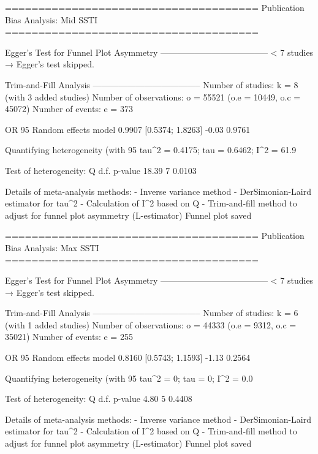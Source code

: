 ======================================
Publication Bias Analysis: Mid SSTI 
======================================
                                                                                                                                                        
Egger's Test for Funnel Plot Asymmetry
--------------------------------------
  < 7 studies → Egger’s test skipped.

Trim-and-Fill Analysis
--------------------------------------
Number of studies: k = 8 (with 3 added studies)
Number of observations: o = 55521 (o.e = 10449, o.c = 45072)
Number of events: e = 373

                         OR           95%
Random effects model 0.9907 [0.5374; 1.8263] -0.03  0.9761

Quantifying heterogeneity (with 95%
 tau^2 = 0.4175; tau = 0.6462; I^2 = 61.9%

Test of heterogeneity:
     Q d.f. p-value
 18.39    7  0.0103

Details of meta-analysis methods:
- Inverse variance method
- DerSimonian-Laird estimator for tau^2
- Calculation of I^2 based on Q
- Trim-and-fill method to adjust for funnel plot asymmetry (L-estimator)
  Funnel plot saved

======================================
Publication Bias Analysis: Max SSTI 
======================================
                                                                                                                                                        
Egger's Test for Funnel Plot Asymmetry
--------------------------------------
  < 7 studies → Egger’s test skipped.

Trim-and-Fill Analysis
--------------------------------------
Number of studies: k = 6 (with 1 added studies)
Number of observations: o = 44333 (o.e = 9312, o.c = 35021)
Number of events: e = 255

                         OR           95%
Random effects model 0.8160 [0.5743; 1.1593] -1.13  0.2564

Quantifying heterogeneity (with 95%
 tau^2 = 0; tau = 0; I^2 = 0.0%

Test of heterogeneity:
    Q d.f. p-value
 4.80    5  0.4408

Details of meta-analysis methods:
- Inverse variance method
- DerSimonian-Laird estimator for tau^2
- Calculation of I^2 based on Q
- Trim-and-fill method to adjust for funnel plot asymmetry (L-estimator)
  Funnel plot saved

